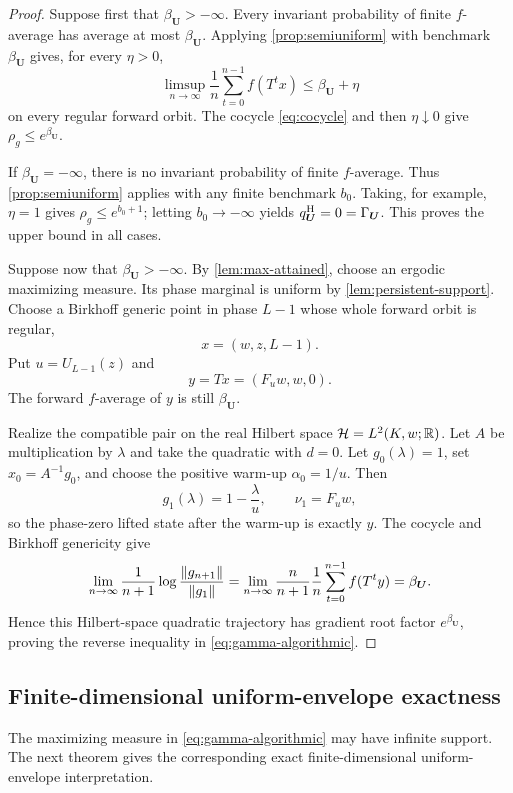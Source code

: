 \documentclass[letterpaper,twoside]{article}
\begin{document}
\begin{proof}
Suppose first that $\beta_{\bm U}>-\infty$.  Every invariant probability of
finite $f$-average has average at most $\beta_{\bm U}$.  Applying
\cref{prop:semiuniform} with benchmark $\beta_{\bm U}$ gives, for every
$\eta>0$,
\[
 \limsup_{n\to\infty}\frac1n
 \sum_{t=0}^{n-1}f(T^tx)\le\beta_{\bm U}+\eta
\]
on every regular forward orbit.  The cocycle \eqref{eq:cocycle} and then
$\eta\downarrow0$ give $\rho_g\le e^{\beta_{\bm U}}$.

If $\beta_{\bm U}=-\infty$, there is no invariant probability of finite
$f$-average.  Thus \cref{prop:semiuniform} applies with any finite benchmark
$b_0$.  Taking, for example, $\eta=1$ gives
$\rho_g\le e^{b_0+1}$; letting $b_0\to-\infty$ yields
 $q^{\rm H}_{\bm U}=0=\Gamma_{\bm U}$.  This proves the upper bound in all
cases.

Suppose now that $\beta_{\bm U}>-\infty$.  By
\cref{lem:max-attained}, choose an ergodic maximizing measure.  Its phase
marginal is uniform by \cref{lem:persistent-support}.  Choose a Birkhoff
generic point in phase $L-1$ whose whole forward orbit is regular,
\[
 x=(w,z,L-1).
\]
Put $u=U_{L-1}(z)$ and
\[
 y=Tx=(F_u w,w,0).
\]
The forward $f$-average of $y$ is still $\beta_{\bm U}$.

Realize the compatible pair on the real Hilbert space
$\mathcal H=L^2(K,w;\mathbb R)$.  Let $A$ be multiplication by $\lambda$ and take
the quadratic with $d=0$.  Let $g_0(\lambda)=1$, set $x_0=A^{-1}g_0$, and
choose the positive warm-up $\alpha_0=1/u$.  Then
\[
 g_1(\lambda)=1-\frac\lambda u,
 \qquad \nu_1=F_u w,
\]
so the phase-zero lifted state after the warm-up is exactly $y$.  The cocycle
and Birkhoff genericity give
\[
 \lim_{n\to\infty}
 \frac1{n+1}\log\frac{\lVert g_{n+1}\rVert}{\lVert g_1\rVert}
 =\lim_{n\to\infty}\frac{n}{n+1}
   \frac1n\sum_{t=0}^{n-1}f(T^ty)
 =\beta_{\bm U}.
\]
Hence this Hilbert-space quadratic trajectory has gradient root factor
$e^{\beta_{\bm U}}$, proving the reverse inequality in
\eqref{eq:gamma-algorithmic}.
\end{proof}

\subsection{Finite-dimensional uniform-envelope exactness}

The maximizing measure in \eqref{eq:gamma-algorithmic} may have infinite
support.  The next theorem gives the corresponding exact finite-dimensional
uniform-envelope interpretation.
\end{document}
